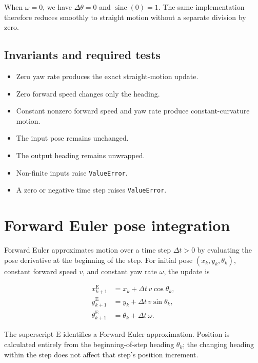 \documentclass[
  australian,
  12pt,
  letterpaper,
  DIV=11,
  numbers=noendperiod,
  twoside]{scrreprt}
\providecommand{\tightlist}{%
  \setlength{\itemsep}{0pt}\setlength{\parskip}{0pt}}
\begin{document}
When \(\omega=0\), we have \(\Delta\theta=0\) and
\(\operatorname{sinc}(0)=1\). The same implementation therefore reduces
smoothly to straight motion without a separate division by zero.

\subsection{Invariants and required
tests}\label{invariants-and-required-tests-1}

\begin{itemize}
\tightlist
\item
  Zero yaw rate produces the exact straight-motion update.
\item
  Zero forward speed changes only the heading.
\item
  Constant nonzero forward speed and yaw rate produce constant-curvature
  motion.
\item
  The input pose remains unchanged.
\item
  The output heading remains unwrapped.
\item
  Non-finite inputs raise \texttt{ValueError}.
\item
  A zero or negative time step raises \texttt{ValueError}.
\end{itemize}

\section{Forward Euler pose
integration}\label{forward-euler-pose-integration}

Forward Euler approximates motion over a time step \(\Delta t>0\) by
evaluating the pose derivative at the beginning of the step. For initial
pose \((x_k,y_k,\theta_k)\), constant forward speed \(v\), and constant
yaw rate \(\omega\), the update is

\[
\begin{aligned}
x_{k+1}^{\mathrm E}
&=
x_k+\Delta t\,v\cos\theta_k,\\
y_{k+1}^{\mathrm E}
&=
y_k+\Delta t\,v\sin\theta_k,\\
\theta_{k+1}^{\mathrm E}
&=
\theta_k+\Delta t\,\omega.
\end{aligned}
\]

The superscript \(\mathrm E\) identifies a Forward Euler approximation.
Position is calculated entirely from the beginning-of-step heading
\(\theta_k\); the changing heading within the step does not affect that
step's position increment.
\end{document}
